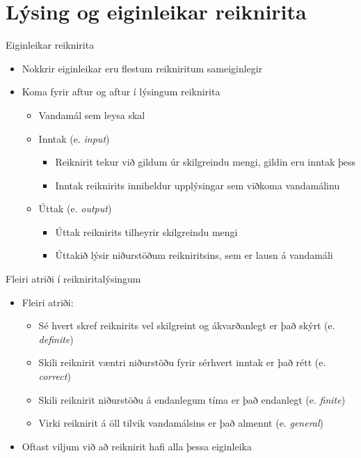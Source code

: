 \documentclass{beamer}
\begin{document}
\section{Lýsing og eiginleikar reiknirita}

\begin{frame}{Eiginleikar reiknirita}
\begin{itemize}
 \item Nokkrir eiginleikar eru flestum reikniritum sameiginlegir
 \item Koma fyrir aftur og aftur í lýsingum reiknirita
 \begin{itemize}
  \item Vandamál sem leysa skal
  \item Inntak (e. \emph{input})
  \begin{itemize}
   \item Reiknirit tekur við gildum úr skilgreindu mengi, gildin eru inntak þess
   \item Inntak reiknirits inniheldur upplýsingar sem viðkoma vandamálinu
  \end{itemize}
  \item Úttak (e. \emph{output})
  \begin{itemize}
   \item Úttak reiknirits tilheyrir skilgreindu mengi
   \item Úttakið lýsir niðurstöðum reikniritsins, sem er lausn á vandamáli
  \end{itemize}
 \end{itemize}
\end{itemize}
\end{frame}

\begin{frame}{Fleiri atriði í reikniritalýsingum}
\begin{itemize}
 \item Fleiri atriði:
 \begin{itemize}
  \item Sé hvert skref reiknirits vel skilgreint og ákvarðanlegt er það skýrt (e. \emph{definite})
  \item Skili reiknirit væntri niðurstöðu fyrir sérhvert inntak er það rétt (e. \emph{correct})
  \item Skili reiknirit niðurstöðu á endanlegum tíma er það endanlegt (e. \emph{finite})
  \item Virki reiknirit á öll tilvik vandamálsins er það almennt (e. \emph{general})
 \end{itemize}
 \item Oftast viljum við að reiknirit hafi alla þessa eiginleika
\end{itemize}
\end{frame}
\end{document}
